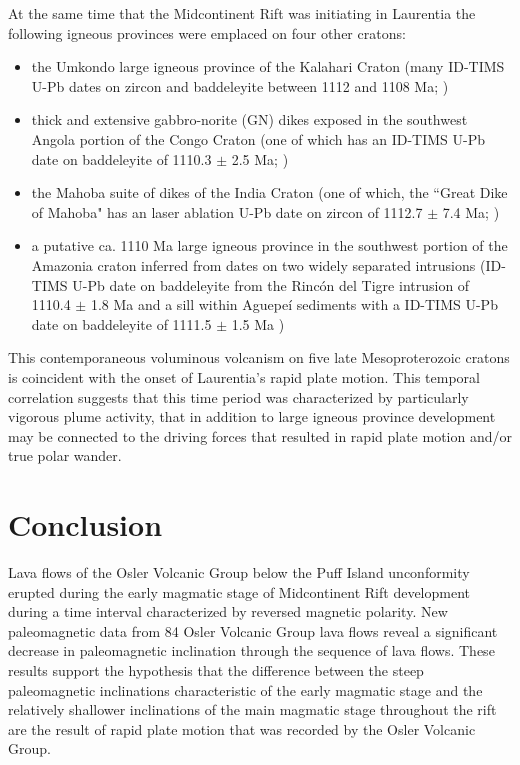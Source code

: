 \documentclass[draft,gc]{AGUTeX}
\begin{document}
\begin{article}
At the same time that the Midcontinent Rift was initiating in Laurentia the following igneous provinces were emplaced on four other cratons:
\begin{itemize}
\item the Umkondo large igneous province of the Kalahari Craton (many ID-TIMS U-Pb dates on zircon and baddeleyite between 1112 and 1108 Ma; \cite{Hanson2004a})
\item  thick and extensive gabbro-norite (GN) dikes exposed in the southwest Angola portion of the Congo Craton (one of which has an ID-TIMS U-Pb date on baddeleyite of 1110.3 $\pm$ 2.5 Ma; \cite{Ernst2013a})
\item the Mahoba suite of dikes of the India Craton (one of which, the ``Great Dike of Mahoba" has an laser ablation U-Pb date on zircon of 1112.7 $\pm$ 7.4 Ma; \cite{Pradhan2012a})
\item a putative ca. 1110 Ma large igneous province in the southwest portion of the Amazonia craton inferred from dates on two widely separated intrusions (ID-TIMS U-Pb date on baddeleyite from the Rinc\'on del Tigre intrusion of 1110.4 $\pm$ 1.8 Ma and a sill within Aguepe\'i sediments with a ID-TIMS U-Pb date on baddeleyite of 1111.5 $\pm$ 1.5 Ma \cite{Hamilton2012a})
\end{itemize}

This contemporaneous voluminous volcanism on five late Mesoproterozoic cratons is coincident with the onset of Laurentia's rapid plate motion. This temporal correlation suggests that this time period was characterized by particularly vigorous plume activity, that in addition to large igneous province development may be connected to the driving forces that resulted in rapid plate motion and/or true polar wander.

\section{Conclusion}

Lava flows of the Osler Volcanic Group below the Puff Island unconformity erupted during the early magmatic stage of Midcontinent Rift development during a time interval characterized by reversed magnetic polarity. New paleomagnetic data from 84 Osler Volcanic Group lava flows reveal a significant decrease in paleomagnetic inclination through the sequence of lava flows. These results support the hypothesis that the difference between the steep paleomagnetic inclinations characteristic of the early magmatic stage and the relatively shallower inclinations of the main magmatic stage throughout the rift are the result of rapid plate motion that was recorded by the Osler Volcanic Group.


\end{article}
\end{document}
